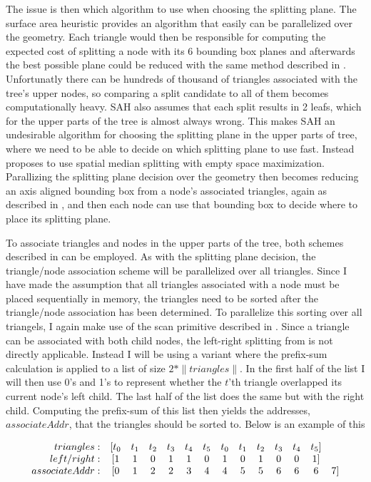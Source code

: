 The issue is then which algorithm to use when choosing the splitting
plane. The surface area heuristic provides an algorithm that easily
can be parallelized over the geometry. Each triangle would then be
responsible for computing the expected cost of splitting a node with
its 6 bounding box planes and afterwards the best possible plane could
be reduced with the same method described in
. Unfortunatly there can be hundreds of
thousand of triangles associated with the tree's upper nodes, so
comparing a split candidate to all of them becomes computationally
heavy. SAH also assumes that each split results in 2 leafs, which for
the upper parts of the tree is almost always wrong. This makes SAH an
undesirable algorithm for choosing the splitting plane in the upper
parts of tree, where we need to be able to decide on which splitting
plane to use fast. Instead \zhou{} proposes to use spatial median
splitting with empty space maximization. Parallizing the splitting
plane decision over the geometry then becomes reducing an axis aligned
bounding box from a node's associated triangles, again as described in
, and then each node can use that bounding box
to decide where to place its splitting plane. 

To associate triangles and nodes in the upper parts of the tree, both schemes
described in  can be employed. As with the
splitting plane decision, the triangle/node association scheme will be
parallelized over all triangles. Since I have made the assumption that all
triangles associated with a node must be placed sequentially in memory, the
triangles need to be sorted after the triangle/node association has been
determined. To parallelize this sorting over all triangels, I again make use of
the scan primitive described in . Since a triangle can
be associated with both child nodes, the left-right splitting from
 is not directly applicable. Instead I will be using a
variant where the prefix-sum calculation is applied to a list of size $2 *
\|triangles\|$. In the first half of the list I will then use 0's and 1's to
represent whether the $t$'th triangle overlapped its current node's left
child. The last half of the list does the same but with the right
child. Computing the prefix-sum of this list then yields the addresses,
$associateAddr$, that the triangles should be sorted to. Below is an example of
this

\begin{displaymath}
  \begin{array}{r c c c c c c c c c c c c c}
    triangles: & [t_0 & t_1 & t_2 & t_3 & t_4 & t_5 & t_0 & t_1 & t_2 & t_3 & t_4 & t_5]\\
    left/right: & [1 & 1 & 0 & 1 & 1 & 0 & 1 & 0 & 1 & 0 & 0 & 1]\\
    associateAddr: & [0 & 1 & 2 & 2 & 3 & 4 & 4 & 5 & 5 & 6 & 6 & 6 & 7]\\
  \end{array}
\end{displaymath}

